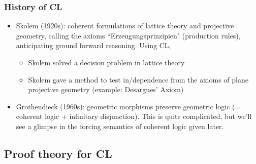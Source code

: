 \documentclass[handout,11pt]{beamer}
\begin{document}
\begin{frame}
\frametitle{History of CL}
 \begin{itemize}[<+->]   %
    \item Skolem (1920s): coherent formulations of lattice theory 
    and projective geometry, calling the axioms ``Erzeugungsprinzipien"
    (production rules), anticipating ground forward reasoning. Using CL,
    \begin{itemize}[<+->]   %
    \item Skolem solved a decision problem in lattice theory
    \item Skolem gave a method to test in/dependence from the axioms
    of plane projective geometry (example: Desargues' Axiom)
    \end{itemize}
    
    \item Grothendieck (1960s): geometric morphisms preserve geometric
              logic (= coherent logic + infinitary disjunction).
    This is quite complicated, but we'll see a glimpse
    in the forcing semantics of coherent logic given later.
 \end{itemize}
\end{frame}

\subsection{Proof theory for CL}
\end{document}
